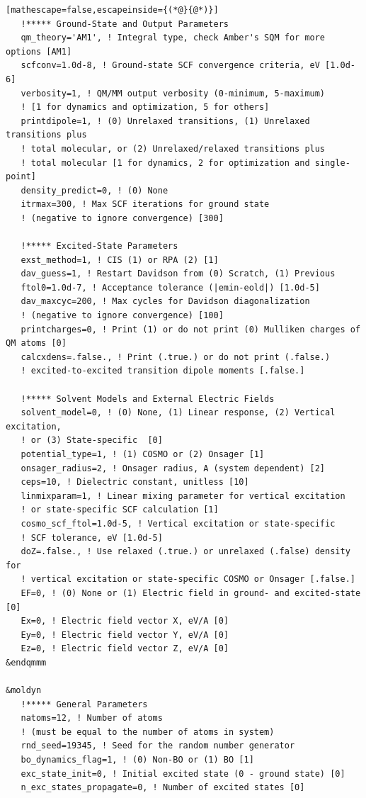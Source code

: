 \documentclass[letterpaper,12pt,titlepage]{article}
\begin{document}
\begin{appendix}
\begin{lstlisting}[mathescape=false,escapeinside={(*@}{@*)}]
   !***** Ground-State and Output Parameters
   qm_theory='AM1', ! Integral type, check Amber's SQM for more options [AM1]
   scfconv=1.0d-8, ! Ground-state SCF convergence criteria, eV [1.0d-6]
   verbosity=1, ! QM/MM output verbosity (0-minimum, 5-maximum)
   ! [1 for dynamics and optimization, 5 for others]
   printdipole=1, ! (0) Unrelaxed transitions, (1) Unrelaxed transitions plus 
   ! total molecular, or (2) Unrelaxed/relaxed transitions plus 
   ! total molecular [1 for dynamics, 2 for optimization and single-point]
   density_predict=0, ! (0) None
   itrmax=300, ! Max SCF iterations for ground state 
   ! (negative to ignore convergence) [300]

   !***** Excited-State Parameters
   exst_method=1, ! CIS (1) or RPA (2) [1]
   dav_guess=1, ! Restart Davidson from (0) Scratch, (1) Previous
   ftol0=1.0d-7, ! Acceptance tolerance (|emin-eold|) [1.0d-5]
   dav_maxcyc=200, ! Max cycles for Davidson diagonalization 
   ! (negative to ignore convergence) [100]
   printcharges=0, ! Print (1) or do not print (0) Mulliken charges of QM atoms [0]
   calcxdens=.false., ! Print (.true.) or do not print (.false.) 
   ! excited-to-excited transition dipole moments [.false.]

   !***** Solvent Models and External Electric Fields
   solvent_model=0, ! (0) None, (1) Linear response, (2) Vertical excitation, 
   ! or (3) State-specific  [0]
   potential_type=1, ! (1) COSMO or (2) Onsager [1]
   onsager_radius=2, ! Onsager radius, A (system dependent) [2]
   ceps=10, ! Dielectric constant, unitless [10]
   linmixparam=1, ! Linear mixing parameter for vertical excitation
   ! or state-specific SCF calculation [1]
   cosmo_scf_ftol=1.0d-5, ! Vertical excitation or state-specific
   ! SCF tolerance, eV [1.0d-5]
   doZ=.false., ! Use relaxed (.true.) or unrelaxed (.false) density for 
   ! vertical excitation or state-specific COSMO or Onsager [.false.]
   EF=0, ! (0) None or (1) Electric field in ground- and excited-state [0]
   Ex=0, ! Electric field vector X, eV/A [0]
   Ey=0, ! Electric field vector Y, eV/A [0]
   Ez=0, ! Electric field vector Z, eV/A [0] 
&endqmmm

&moldyn
   !***** General Parameters
   natoms=12, ! Number of atoms 
   ! (must be equal to the number of atoms in system)
   rnd_seed=19345, ! Seed for the random number generator
   bo_dynamics_flag=1, ! (0) Non-BO or (1) BO [1]
   exc_state_init=0, ! Initial excited state (0 - ground state) [0]
   n_exc_states_propagate=0, ! Number of excited states [0]


\end{lstlisting}
\end{appendix}
\end{document}
